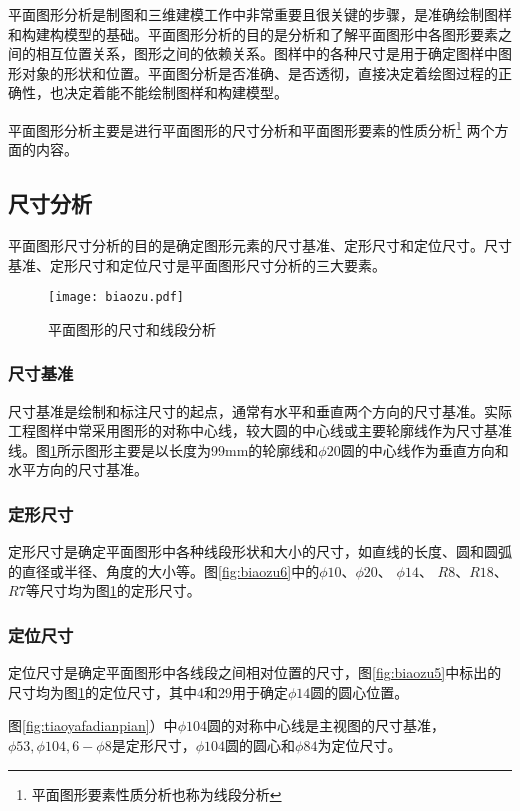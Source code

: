 平面图形分析是制图和三维建模工作中非常重要且很关键的步骤，是准确绘制图样和构建构模型的基础。平面图形分析的目的是分析和了解平面图形中各图形要素之间的相互位置关系，图形之间的依赖关系。图样中的各种尺寸是用于确定图样中图形对象的形状和位置。平面图分析是否准确、是否透彻，直接决定着绘图过程的正确性，也决定着能不能绘制图样和构建模型。

平面图形分析主要是进行平面图形的尺寸分析和平面图形要素的性质分析\footnote{平面图形要素性质分析也称为线段分析} 两个方面的内容。

\subsection{尺寸分析}
平面图形尺寸分析的目的是确定图形元素的尺寸基准、定形尺寸和定位尺寸。尺寸基准、定形尺寸和定位尺寸是平面图形尺寸分析的三大要素。

\begin{figure}[htbp]
\centering
\texttt{[image: biaozu.pdf]}
\caption{平面图形的尺寸和线段分析} \label{fig:biaozu}
\end{figure}

\subsubsection{尺寸基准} 

尺寸基准是绘制和标注尺寸的起点，通常有水平和垂直两个方向的尺寸基准。实际工程图样中常采用图形的对称中心线，较大圆的中心线或主要轮廓线作为尺寸基准线。图\ref{fig:biaozu}所示图形主要是以长度为99mm的轮廓线和$\phi 20$圆的中心线作为垂直方向和水平方向的尺寸基准。

\subsubsection{定形尺寸} 

定形尺寸是确定平面图形中各种线段形状和大小的尺寸，如直线的长度、圆和圆弧的直径或半径、角度的大小等。图\ref{fig:biaozu6}中的$\phi 10$、$\phi 20$、 $\phi 14$、 $R8$、$R18$、$R7$等尺寸均为图\ref{fig:biaozu}的定形尺寸。

\begin{figure}[htbp]
\centering
\begin{floatrow}
\end{floatrow}
\end{figure}

\subsubsection{定位尺寸} 

定位尺寸是确定平面图形中各线段之间相对位置的尺寸，图\ref{fig:biaozu5}中标出的尺寸均为图\ref{fig:biaozu}的定位尺寸，其中4和29用于确定$\phi 14$圆的圆心位置。

图\ref{fig:tiaoyafadianpian}）中$\phi 104$圆的对称中心线是主视图的尺寸基准，$\phi 53,\phi 104,6-\phi 8$是定形尺寸，$\phi 104$圆的圆心和$\phi 84$为定位尺寸。

\endinput